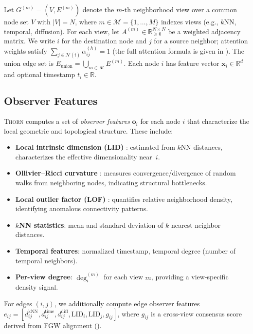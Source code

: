 \documentclass[11pt,a4paper]{article}
\newcommand{\thorn}{\textsc{Thorn}}
\newcommand{\RR}{\mathbb{R}}
\newcommand{\calM}{\mathcal{M}}
\newcommand{\calN}{\mathcal{N}}
\begin{document}
Let $G^{(m)} = (V, E^{(m)})$ denote the $m$-th neighborhood view over a
common node set $V$ with $|V| = N$, where
$m \in \calM = \{1, \ldots, M\}$ indexes views (e.g., $k$NN, temporal,
diffusion).
For each view, let $A^{(m)} \in \RR_{\ge 0}^{N \times N}$ be a weighted
adjacency matrix.
We write $i$ for the destination node and $j$ for a source neighbor;
attention weights satisfy
$\sum_{j \in \calN(i)} \alpha_{ij}^{(h)} = 1$
(the full attention formula is given in ).
The union edge set is
$E_{\mathrm{union}} = \bigcup_{m \in \calM} E^{(m)}$.
Each node $i$ has feature vector $\mathbf{x}_i \in \RR^{d}$ and
optional timestamp $t_i \in \RR$.

\subsection{Observer Features}
\label{sec:observers}

\thorn{} computes a set of \emph{observer features} $\mathbf{o}_i$ for
each node $i$ that characterize the local geometric and topological
structure.  These include:

\begin{itemize}[nosep]
  \item \textbf{Local intrinsic dimension (LID)}
    \citep{levina2004maximum}: estimated from $k$NN distances,
    characterizes the effective dimensionality near~$i$.
  \item \textbf{Ollivier--Ricci curvature} \citep{ollivier2009ricci}:
    measures convergence/divergence of random walks from neighboring
    nodes, indicating structural bottlenecks.
  \item \textbf{Local outlier factor (LOF)} \citep{breunig2000lof}:
    quantifies relative neighborhood density, identifying anomalous
    connectivity patterns.
  \item \textbf{$k$NN statistics}: mean and standard deviation of
    $k$-nearest-neighbor distances.
  \item \textbf{Temporal features}: normalized timestamp, temporal
    degree (number of temporal neighbors).
  \item \textbf{Per-view degree}: $\deg_i^{(m)}$ for each view $m$,
    providing a view-specific density signal.
\end{itemize}

For edges $(i, j)$, we additionally compute edge observer features
$e_{ij} = [d_{ij}^{\text{kNN}}, d_{ij}^{\text{time}},
d_{ij}^{\text{diff}}, \mathrm{LID}_i, \mathrm{LID}_j, g_{ij}]$,
where $g_{ij}$ is a cross-view consensus score derived from FGW
alignment ().
\end{document}
